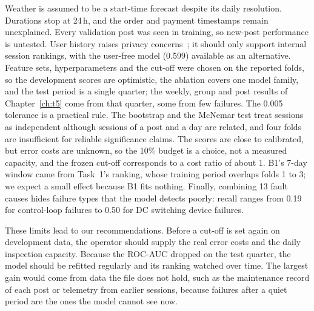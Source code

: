 \documentclass[12pt,a4paper,openany]{report}
\begin{document}
Weather is assumed to be a start-time forecast despite its daily resolution. Durations stop at 24\,h, and the
order and payment timestamps remain unexplained. Every validation post was seen in training, so new-post performance
is untested. User history raises privacy concerns~\cite{gdpr}; it should only support internal session rankings,
with the user-free model (0.599) available as an alternative. Feature sets, hyperparameters and the cut-off were chosen on the
reported folds, so the development scores are optimistic, the ablation covers one model family, and the test
period is a single quarter; the weekly, group and post results of Chapter~\ref{ch:t5} come from that quarter, some
from few failures. The 0.005 tolerance is a practical rule. The bootstrap and the McNemar test treat sessions as
independent although sessions of a post and a day are related, and four folds are insufficient for reliable
significance claims. The scores are close to calibrated, but error costs are unknown, so the 10\% budget is a choice,
not a measured capacity, and the frozen cut-off corresponds to a cost ratio of about 1. B1's 7-day window came
from Task~1's ranking, whose training period overlaps folds 1 to 3; we expect a small effect because B1 fits
nothing. Finally, combining 13 fault causes hides failure types that the model detects poorly: recall ranges from
0.19 for control-loop failures to 0.50 for DC switching device failures.

These limits lead to our recommendations. Before a cut-off is set again on development data, the operator should
supply the real error costs and the daily inspection capacity. Because the \acs{ROC-AUC} dropped on the test
quarter, the model should be refitted regularly and its ranking watched over time. The largest gain would come from
data the file does not hold, such as the maintenance record of each post or telemetry from earlier sessions, because
failures after a quiet period are the ones the model cannot see now.
\end{document}
